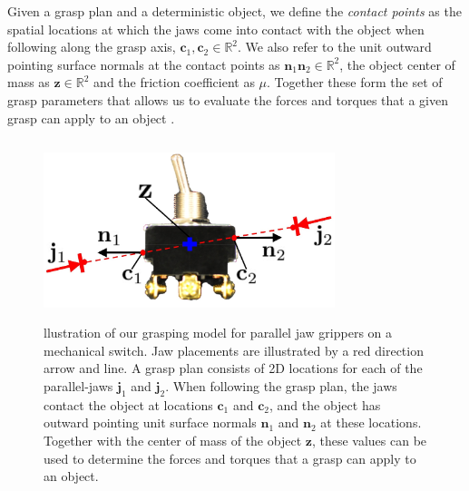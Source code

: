 \documentclass[10pt, conference]{ieeeconf}      %
\newcommand{\bc}{\mathbf{c}}
\newcommand{\bj}{\mathbf{j}}
\newcommand{\bn}{\mathbf{n}}
\newcommand{\bz}{\mathbf{z}}
\begin{document}
Given a grasp plan and a deterministic object, we define the {\it contact points} as the spatial locations at which the jaws come into contact with the object when following along the grasp axis, $\bc_1, \bc_2 \in \mathbb{R}^2$.
We also refer to the unit outward pointing surface normals at the contact points as $\bn_1 \bn_2 \in \mathbb{R}^2$, the object center of mass as $\bz \in \mathbb{R}^2$ and the friction coefficient as $\mu$.
Together these form the set of grasp parameters that allows us to evaluate the forces and torques that a given grasp can apply to an object \cite{ferrari1992}. 


\begin{figure}[t!]
\centering
\includegraphics[width = 8.5cm, height = 5.25cm]{figures/bandit_grasp_model.jpg}
\caption{llustration of our grasping model for parallel jaw grippers on a mechanical switch. Jaw placements are illustrated by a red direction arrow and line. A grasp plan consists of 2D locations for each of the parallel-jaws $\bj_1$ and $\bj_2$. When following the grasp plan, the jaws contact the object at locations $\bc_1$ and $\bc_2$, and the object has outward pointing unit surface normals $\bn_1$ and $\bn_2$ at these locations. Together with the center of mass of the object $\bz$, these values can be used to determine the forces and torques that a grasp can apply to an object.}
\vspace*{-2ex}
\label{fig:grasp_model}
\end{figure}
\end{document}
